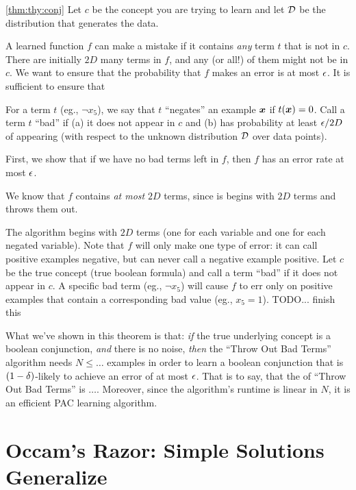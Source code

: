 \begin{myproof}{\ref{thm:thy:conj}}
  Let $c$ be the concept you are trying to learn and let $\mathcal{D}$ be the
  distribution that generates the data.


  A learned function $f$ can make a mistake if it contains \emph{any}
  term $t$ that is not in $c$.  There are initially $2D$ many terms in
  $f$, and any (or all!) of them might not be in $c$.  We want to
  ensure that the probability that $f$ makes an error is at most
  $\epsilon$.  It is sufficient to ensure that 

For a term $t$
  (eg., $\lnot x_5$), we say that $t$ ``negates'' an example ${\boldsymbol{x}}$ if
  $t({\boldsymbol{x}}) = 0$.  Call a term $t$ ``bad'' if (a) it does not appear in
  $c$ and (b) has probability at least $\epsilon/2D$ of appearing (with
  respect to the unknown distribution $\mathcal{D}$ over data points).

  First, we show that if we have no bad terms left in $f$, then $f$
  has an error rate at most $\epsilon$.  

We know that $f$ contains \emph{at
    most} $2D$ terms, since is begins with $2D$ terms and throws them
  out.  

  The algorithm begins with $2D$ terms (one for each variable and one
  for each negated variable).  Note that $f$ will only make one type
  of error: it can call positive examples negative, but can never call
  a negative example positive.  Let $c$ be the true concept (true
  boolean formula) and call a term ``bad'' if it does not appear in
  $c$.  A specific bad term (eg., $\lnot x_5$) will cause $f$ to err
  only on positive examples that contain a corresponding bad value
  (eg., $x_5 = 1$).    TODO... finish this
\end{myproof}

What we've shown in this theorem is that: \emph{if} the true
underlying concept is a boolean conjunction, \emph{and} there is no
noise, \emph{then} the ``Throw Out Bad Terms'' algorithm needs $N \leq
\dots$ examples in order to learn a boolean conjunction that is
$(1-\delta)$-likely to achieve an error of at most $\epsilon$.  That is to
say, that the  of ``Throw Out Bad Terms''
is $\dots$.  Moreover, since the algorithm's runtime is linear in $N$,
it is an efficient PAC learning algorithm.

\section{Occam's Razor: Simple Solutions Generalize}

